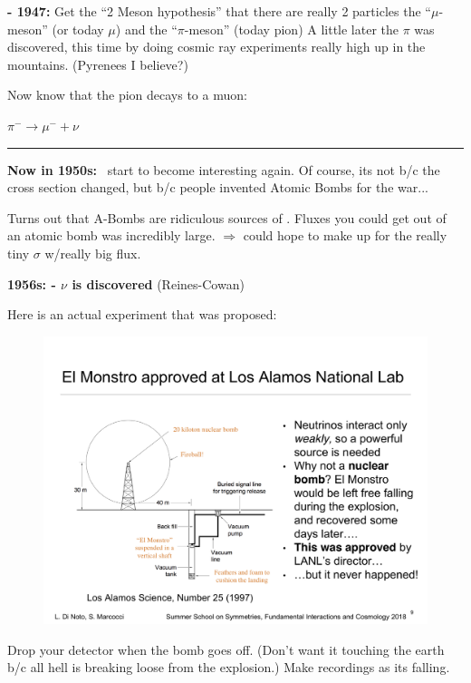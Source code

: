 {\textbf{- 1947:} Get the ``2 Meson  hypothesis'' that there are really 2 particles the ``$\mu$-meson'' (or today $\mu$) and the ``$\pi$-meson'' (today pion) 
A little later the $\pi$ was discovered, this time by doing cosmic ray experiments really high up in the mountains. (Pyrenees I believe?)

Now know that the pion decays to a muon:

\bc
$\pi^- \rightarrow \mu^- + \nu$
\ec

\noindent\rule{\textwidth}{1pt}

\textbf{Now in 1950s:} 
\nus\ start to become interesting again. 
Of course, its not b/c the cross section changed, but b/c people invented Atomic Bombs for the war...

Turns out that A-Bombs are ridiculous sources of \nus. 
Fluxes you could get out of an atomic bomb was incredibly large. 
$\Rightarrow$ could hope to make up for the really tiny $\sigma$ w/really big flux. 

\clearpage

\textbf{1956s: - $\nu$ is discovered}  (Reines-Cowan) 

Here is an actual experiment that was proposed: 

\begin{figure}[h!]
\centering
\includegraphics[width=1.0\textwidth]{./ABomb.pdf}
\end{figure}



Drop your detector when the bomb goes off. 
(Don't want it touching the earth b/c all hell is breaking loose from the explosion.)
Make recordings as its falling. 

}
